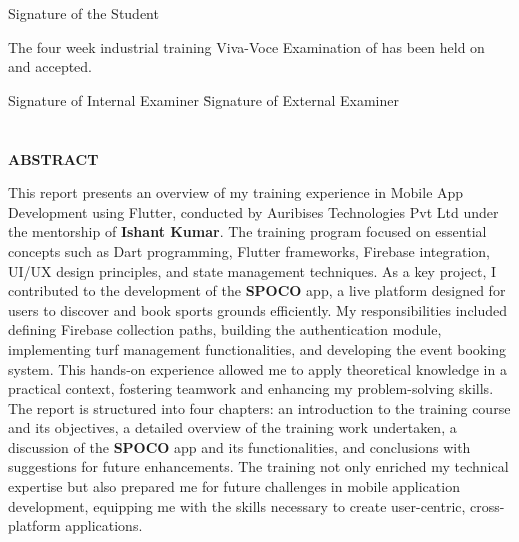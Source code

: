 \documentclass[12pt,a4paper]{report}
\begin{document}
\vspace{3cm}
\begin{flushleft}
    Signature of the Student\\
\end{flushleft}

\vspace{2cm}
The four week industrial training Viva-Voce Examination of \underline{\hspace{5cm}} has been held on \underline{\hspace{3cm}} and accepted.

\vspace{3cm}
\begin{tabbing}
    Signature of Internal Examiner \hspace{4cm} \= Signature of External Examiner
\end{tabbing}

\newpage

\chapter*{}
\begin{center}
    \textbf{ABSTRACT}
\end{center}
This report presents an overview of my training experience in Mobile App Development using Flutter, conducted by Auribises Technologies Pvt Ltd under the mentorship of \textbf{Ishant Kumar}. The training program focused on essential concepts such as Dart programming, Flutter frameworks, Firebase integration, UI/UX design principles, and state management techniques. As a key project, I contributed to the development of the \textbf{SPOCO} app, a live platform designed for users to discover and book sports grounds efficiently.
My responsibilities included defining Firebase collection paths, building the authentication module, implementing turf management functionalities, and developing the event booking system. This hands-on experience allowed me to apply theoretical knowledge in a practical context, fostering teamwork and enhancing my problem-solving skills.
The report is structured into four chapters: an introduction to the training course and its objectives, a detailed overview of the training work undertaken, a discussion of the \textbf{SPOCO} app and its functionalities, and conclusions with suggestions for future enhancements. The training not only enriched my technical expertise but also prepared me for future challenges in mobile application development, equipping me with the skills necessary to create user-centric, cross-platform applications.
\end{document}
